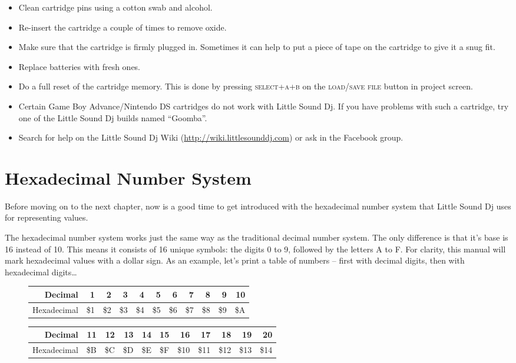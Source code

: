 \begin{itemize}
\item Clean cartridge pins using a cotton swab and alcohol.
\item Re-insert the cartridge a couple of times to remove oxide.
\item Make sure that the cartridge is firmly plugged in. Sometimes it can help to put a piece of tape on the cartridge to give it a snug fit.
\item Replace batteries with fresh ones.
\item Do a full reset of the cartridge memory. This is done by pressing \textsc{select+a+b} on the \textsc{load/save file} button in project screen.
\item Certain Game Boy Advance/Nintendo DS cartridges do not work with Little Sound Dj. If you have problems with such a cartridge, try one of the Little Sound Dj builds named ``Goomba''.
\item Search for help on the Little Sound Dj Wiki (\url{http://wiki.littlesounddj.com}) or ask in the Facebook group.
\end{itemize}

\section{Hexadecimal Number System}

Before moving on to the next chapter, now is a good time to get introduced with the hexadecimal number system that Little Sound Dj uses for representing values.

The hexadecimal number system works just the same way as the traditional decimal number system. The only difference is that it's base is 16 instead of 10. This means it consists of 16 unique symbols: the digits 0 to 9, followed by the letters A to F. For clarity, this manual will mark hexadecimal values with a dollar sign.
As an example, let's print a table of numbers -- first with decimal digits, then with
hexadecimal digits\ldots

\begin{figure}[hbtp]
\centering

\begin{tabular}{r|r|r|r|r|r|r|r|r|r|r}
 Decimal & 1 & 2 & 3 & 4 & 5 & 6 & 7 & 8 & 9 & 10 \\
\hline
 Hexadecimal & \$1 & \$2 & \$3 & \$4 & \$5 & \$6 & \$7 & \$8 & \$9 & \$A \\
\end{tabular}

\begin{tabular}{r|r|r|r|r|r|r|r|r|r|r}
 Decimal & 11 & 12 & 13 & 14 & 15 & 16 & 17 & 18 & 19 & 20 \\
\hline
 Hexadecimal & \$B & \$C & \$D & \$E & \$F & \$10 & \$11 & \$12 & \$13 & \$14  \\
\end{tabular}

\end{figure}

